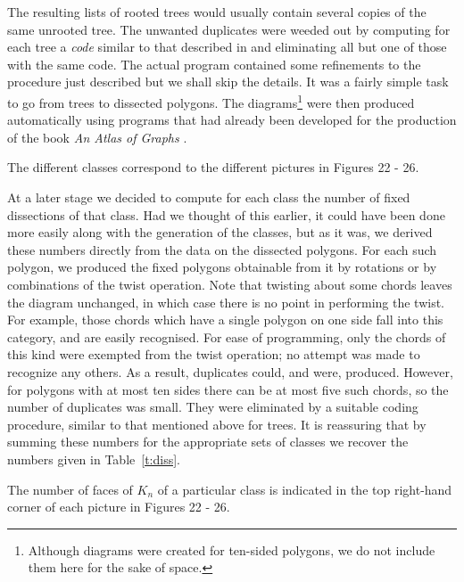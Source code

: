 \documentclass[10pt]{amsart}
\begin{document}
The resulting lists of rooted trees would usually contain several copies of the same unrooted tree.   The unwanted duplicates were weeded out by computing for each tree a {\em code} similar to that described in \cite{r2} and eliminating all but one of those with the same code.   The actual program contained some refinements to the procedure just described but we shall skip the details. It was a fairly simple task to go from trees to dissected polygons.  The diagrams\footnote{Although diagrams were created for ten-sided polygons, we do not include them here for the sake of space.} were then produced automatically using programs that had already been developed for the production of the book {\em An Atlas of Graphs} \cite{rw}.

\begin{prop}[Solution to {\em P2}\,]
The different classes correspond to the different pictures in Figures 22 - 26.
\end{prop}

At a later stage we decided to compute for each class the number of fixed dissections of that class.   Had we thought of this earlier, it could have been done more easily along with the generation of the classes, but as it was, we derived these numbers directly from the data on the dissected polygons.   For each such polygon, we produced the fixed polygons obtainable from it by rotations or by combinations of the twist operation.   Note that twisting about some chords leaves the diagram unchanged, in which case there is no point in performing the twist.   For example, those chords which have a single polygon on one side fall into this category, and are easily recognised.   For ease of programming, only the chords of this kind were exempted from the twist operation; no attempt was made to recognize any others. As a result, duplicates could, and were, produced.   However, for polygons with at most ten sides there can be at most five such chords, so the number of duplicates was small.   They were eliminated by a suitable coding procedure, similar to that mentioned above for trees. It is reassuring that by summing these numbers for the appropriate sets of classes we recover the numbers given in Table~\ref{t:diss}.

\begin{prop}[Solution to {\em P3}\,]
The number of faces of $K_n$ of a particular class is indicated in the top right-hand corner of each picture in Figures 22 - 26.
\label{p:cp3}
\end{prop}
\end{document}

